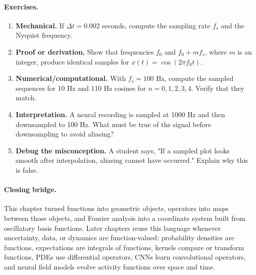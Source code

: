 \paragraph{Exercises.}
\begin{enumerate}[label=\textbf{12.4.\arabic*.}, leftmargin=*]
\item \textbf{Mechanical.} If \(\Delta t=0.002\) seconds, compute the sampling rate \(f_s\) and the Nyquist frequency.
\item \textbf{Proof or derivation.} Show that frequencies \(f_0\) and \(f_0+mf_s\), where \(m\) is an integer, produce identical samples for \(x(t)=\cos(2\pi f_0t)\).
\item \textbf{Numerical/computational.} With \(f_s=100\) Hz, compute the sampled sequences for 10 Hz and 110 Hz cosines for \(n=0,1,2,3,4\). Verify that they match.
\item \textbf{Interpretation.} A neural recording is sampled at 1000 Hz and then downsampled to 100 Hz. What must be true of the signal before downsampling to avoid aliasing?
\item \textbf{Debug the misconception.} A student says, "If a sampled plot looks smooth after interpolation, aliasing cannot have occurred." Explain why this is false.
\end{enumerate}

\paragraph{Closing bridge.}
This chapter turned functions into geometric objects, operators into maps between those objects, and Fourier analysis into a coordinate system built from oscillatory basis functions. Later chapters reuse this language whenever uncertainty, data, or dynamics are function-valued: probability densities are functions, expectations are integrals of functions, kernels compare or transform functions, PDEs use differential operators, CNNs learn convolutional operators, and neural field models evolve activity functions over space and time.

\clearpage
